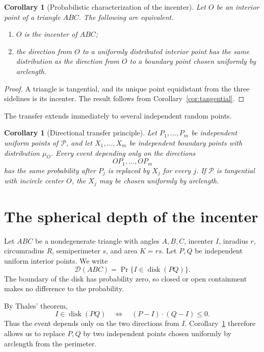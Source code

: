 \documentclass[11pt]{article}
\newtheorem{corollary}[theorem]{Corollary}
\theoremstyle{definition}
\theoremstyle{remark}
\begin{document}
\begin{corollary}[Probabilistic characterization of the incenter]
\label{cor:incenter}
Let $O$ be an interior point of a triangle $ABC$.  The following are equivalent.
\begin{enumerate}[label=\textup{(\roman*)}]
\item $O$ is the incenter of $ABC$;
\item the direction from $O$ to a uniformly distributed interior point has the same distribution as the direction from $O$ to a boundary point chosen uniformly by arclength.
\end{enumerate}
\end{corollary}

\begin{proof}
A triangle is tangential, and its unique point equidistant from the three sidelines is its incenter.  The result follows from Corollary~\ref{cor:tangential}.
\end{proof}

The transfer extends immediately to several independent random points.

\begin{corollary}[Directional transfer principle]
\label{cor:multi}
Let $P_1,\dots,P_m$ be independent uniform points of $\mathcal P$, and let $X_1,\dots,X_m$ be independent boundary points with distribution $\mu_O$.  Every event depending only on the directions
\[
OP_1,\dots,OP_m
\]
has the same probability after $P_j$ is replaced by $X_j$ for every $j$.  If $\mathcal P$ is tangential with incircle center $O$, the $X_j$ may be chosen uniformly by arclength.
\end{corollary}

\section{The spherical depth of the incenter}
\label{sec:formula}

Let $ABC$ be a nondegenerate triangle with angles $A,B,C$, incenter $I$, inradius $r$, circumradius $R$, semiperimeter $s$, and area $K=rs$.  Let $P,Q$ be independent uniform interior points.  We write
\[
\mathcal D(ABC)=\Pr\{I\in\operatorname{disk}(PQ)\}.
\]
The boundary of the disk has probability zero, so closed or open containment makes no difference to the probability.

By Thales' theorem,
\begin{equation}
\label{eq:thales}
I\in\operatorname{disk}(PQ)
\quad\Longleftrightarrow\quad
(P-I)\cdot(Q-I)\le0.
\end{equation}
Thus the event depends only on the two directions from $I$.  Corollary~\ref{cor:multi} therefore allows us to replace $P,Q$ by two independent points chosen uniformly by arclength from the perimeter.
\end{document}
